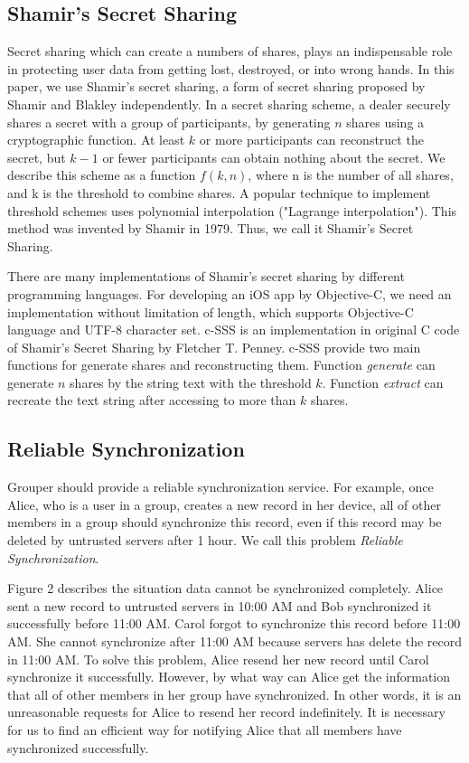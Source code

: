 \documentclass[twocolumn,10pt]{article}
\begin{document}
\subsection{Shamir's Secret Sharing}
Secret sharing which can create a numbers of shares, plays an indispensable role in protecting user data from getting lost, destroyed, or into wrong hands. In this paper, we use Shamir's secret sharing, a form of secret sharing proposed by Shamir and Blakley independently. In a secret sharing scheme, a dealer securely shares a secret with a group of participants, by generating $n$ shares using a cryptographic function\cite{smith2013layered}. At least $k$ or more participants can reconstruct the secret, but $k-1$ or fewer participants can obtain nothing about the secret\cite{pang2005new}. We describe this scheme as a function $f(k, n)$, where n is the number of all shares, and k is the threshold to combine shares. A popular technique to implement threshold schemes uses polynomial interpolation ("Lagrange interpolation"). This method was invented by Shamir in 1979. Thus, we call it Shamir's Secret Sharing.

There are many implementations of Shamir's secret sharing by different programming languages. For developing an iOS app by Objective-C, we need an implementation without limitation of length, which supports Objective-C language and UTF-8 character set. c-SSS\cite{c-sss} is an implementation in original C code of Shamir's Secret Sharing by Fletcher T. Penney. c-SSS provide two main functions for generate shares and reconstructing them. Function \emph{generate} can generate $n$ shares by the string text with the threshold $k$. Function \emph{extract} can recreate the text string after accessing to more than $k$ shares.

\subsection{Reliable Synchronization}
Grouper should provide a reliable synchronization service. For example, once Alice, who is a user in a group, creates a new record in her device, all of other members in a group should synchronize this record, even if this record may be deleted by untrusted servers after 1 hour. We call this problem \emph{Reliable Synchronization}.

Figure 2 describes the situation data cannot be synchronized completely. Alice sent a new record to untrusted servers in 10:00 AM and Bob synchronized it successfully before 11:00 AM. Carol forgot to synchronize this record before 11:00 AM. She cannot synchronize after 11:00 AM because servers has delete the record in 11:00 AM. To solve this problem, Alice resend her new record until Carol synchronize it successfully. However, by what way can Alice get the information that all of other members in her group have synchronized. In other words, it is an unreasonable requests for Alice to resend her record indefinitely. It is necessary for us to find an efficient way for notifying Alice that all members have synchronized successfully.
\end{document}
